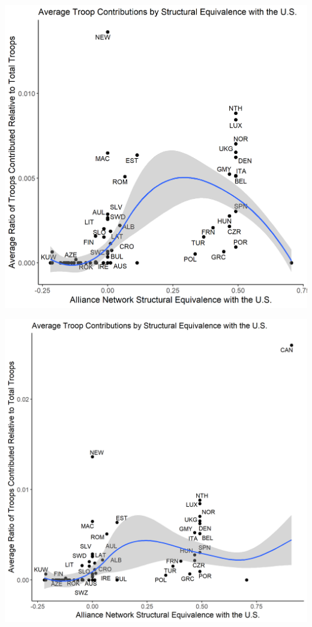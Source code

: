 \documentclass[11pt]{beamer}
\begin{document}
\begin{frame}{}
  \centering
  \includegraphics[scale = 0.575]{../figures/contributions.png}
\end{frame}

\begin{frame}{}
  \centering
  \includegraphics[scale = 0.55]{../figures/contributions_canada.png}
\end{frame}
\end{document}
